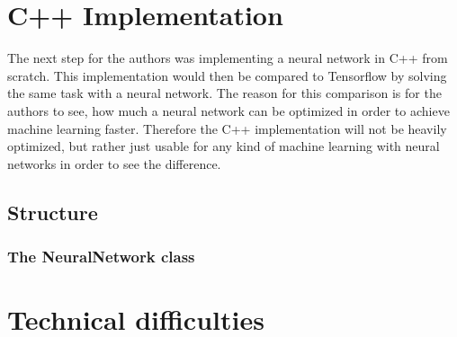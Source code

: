 \section{C++ Implementation}

The next step for the authors was implementing a neural network in C++ from scratch. This implementation would then be compared to Tensorflow by solving the same task with a neural network. The reason for this comparison is for the authors to see, how much a neural network can be optimized in order to achieve machine learning faster. Therefore the C++ implementation will not be heavily optimized, but rather just usable for any kind of machine learning with neural networks in order to see the difference.

\subsection{Structure}

\subsubsection{The NeuralNetwork class}

\section{Technical difficulties}

\filbreak
